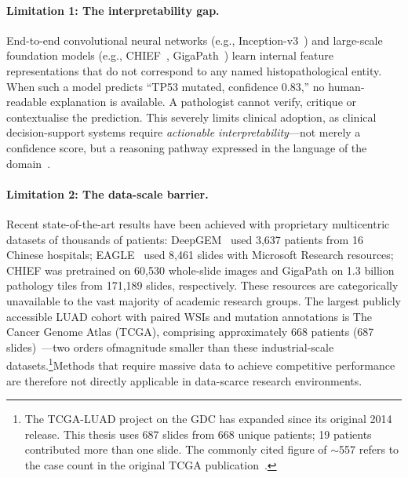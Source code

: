 \paragraph{Limitation 1: The interpretability gap.}
End-to-end convolutional neural networks (e.g., Inception-v3~\cite{coudray2018classification}) and large-scale foundation models (e.g., CHIEF~\cite{wang2024chief}, GigaPath~\cite{xu2024gigapath}) learn internal feature representations that do not correspond to any named histopathological entity.  When such a model predicts ``TP53 mutated, confidence 0.83,'' no human-readable explanation is available.  A pathologist cannot verify, critique or contextualise the prediction.  This severely limits clinical adoption, as clinical decision-support systems require \emph{actionable interpretability}---not merely a confidence score, but a reasoning pathway expressed in the language of the domain~\cite{holzinger2019causability}.

\paragraph{Limitation 2: The data-scale barrier.}

Recent state-of-the-art results have been achieved with proprietary
multicentric datasets of thousands of patients:
DeepGEM~\cite{zhao2025deepgem} used 3{,}637 patients from 16 Chinese
hospitals; EAGLE~\cite{campanella2025eagle} used 8{,}461 slides with
Microsoft Research resources; CHIEF was pretrained on 60{,}530 whole-slide images and GigaPath on
1.3 billion pathology tiles from 171{,}189 slides, respectively.
These resources are categorically unavailable to the vast majority of
academic research groups.
The largest publicly accessible LUAD cohort with paired WSIs and mutation
annotations is The Cancer Genome Atlas (TCGA), comprising approximately
668 patients (687 slides)~\cite{tcga2014luad}---two orders ofmagnitude smaller than these industrial-scale datasets.\footnote{The
TCGA-LUAD project on the GDC has expanded since its original 2014 release.
This thesis uses 687 slides from 668 unique patients; 19 patients
contributed more than one slide.
The commonly cited figure of $\sim$557 refers to the case count in the
original TCGA publication~\cite{tcga2014luad}.}Methods that require massive data to achieve competitive performance are
therefore not directly applicable in data-scarce research environments.
